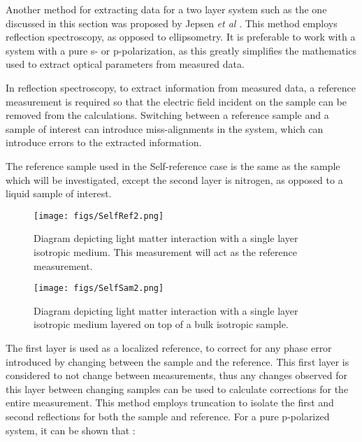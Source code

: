 Another method for extracting data for a two layer system such as the one discussed in this section was proposed by Jepsen \textit{et al} \cite{Jepsen-2007}.
This method employs reflection spectroscopy, as opposed to ellipsometry. It is preferable to work with a system with a pure s- or p-polarization, as this greatly simplifies the mathematics used to extract optical parameters from measured data.  

In reflection spectroscopy, to extract information from measured data, a reference measurement is required so that the electric field incident on the sample can be removed from the calculations. Switching between a reference sample and a sample of interest can introduce miss-alignments in the system, which can introduce errors to the extracted information.

The reference sample used in the Self-reference case is the same as the sample which will be investigated, except the second layer is nitrogen, as opposed to a liquid sample of interest. 

\begin{figure}[H]
\begin{center}
	 \texttt{[image: figs/SelfRef2.png]}
	 \caption[Diagram of light-matter interaction with empty reference cuvette]{Diagram depicting light matter interaction with a single layer isotropic medium. This measurement will act as the reference measurement.}
   \label{fig:SelfRef}
\end{center}
\end{figure}

\begin{figure}[H]
\begin{center}
	 \texttt{[image: figs/SelfSam2.png]}
	 \caption[Diagram of light-matter interaction with filled cuvette]{Diagram depicting light matter interaction with a single layer isotropic medium layered on top of a bulk isotropic sample.}
   \label{fig:SelSam}
\end{center}
\end{figure}

The first layer is used as a localized reference, to correct for any phase error introduced by changing between the sample and the reference. This first layer is considered to not change between measurements, thus any changes observed for this layer between changing samples can be used to calculate corrections for the entire measurement.
 This method employs truncation to isolate the first and second reflections for both the sample and reference. For a pure p-polarized system, it can be shown that \cite{Jepsen-2007}:

